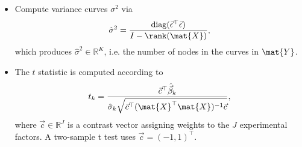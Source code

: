 \begin{itemize}
        \item Compute variance curves $ \sigma^{2} $ via
        \begin{equation*}
            \hat{\sigma}^{2} = \frac{\mathrm{diag}(\vec{\epsilon}^{\top} \vec{\epsilon})}{I - \rank (\mat{X})},
        \end{equation*}
        which produces $ \hat{\sigma}^{2} \in \mathbb{R}^{K} $, i.e. the number of nodes in the curves in $ \mat{Y} $.
        
        \item The $ t $ statistic is computed according to
        \begin{equation*}
            t_{k} = \frac{\vec{c}^{\top} \hat{\vec{\beta}}_{k}}{\hat{\sigma}_{k} \sqrt{\vec{c}^{\top} (\mat{X}^{\top} \mat{X})^{-1} \vec{c}}},
        \end{equation*}
        where $ \vec{c} \in \mathbb{R}^{J} $ is a contrast vector assigning weights to the $ J $ experimental factors.
        A two-sample t test uses $ \vec{c} = (-1, 1)^{\top} $.
        
    
    \end{itemize}

